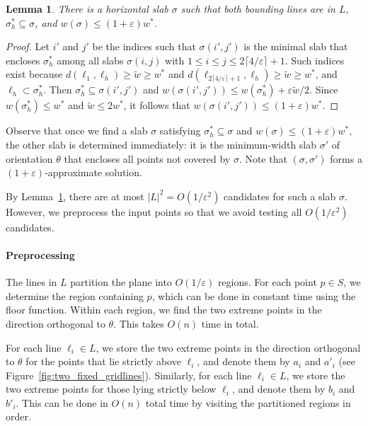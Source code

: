 \documentclass[10pt,a4paper]{article}
\newtheorem{lemma}[theorem]{Lemma}
\theoremstyle{star}
\theoremstyle{claimstar}
\newcommand{\eps}{\ensuremath{\varepsilon}}
\begin{document}
\begin{lemma}
    \label{lem:two_fixed_gridlines}
    There is a horizontal slab $\sigma$ such that  
    both bounding lines are in $L$, 
    $\sigma_h^* \subseteq \sigma $, and $w(\sigma) \le (1 + \eps) w^*$.
\end{lemma}
\begin{proof}
    Let $i'$ and $j'$ be the indices such that $\sigma(i', j')$ is the minimal slab that encloses $\sigma_h^*$ among all slabs $\sigma(i,j)$ with $1 \le i \le j \le 2\lceil 4/\eps \rceil + 1$.
    Such indices exist because $d(\ell_1, \ell_h) \ge \widetilde w \ge w^*$ and $d(\ell_{2 \lceil 4/\eps \rceil +1 }, \ell_h)\ge \widetilde w \ge w^*$, and $\ell_h \subset \sigma_h^*$. 
    Then $\sigma_h^* \subseteq \sigma(i', j')$ and $w(\sigma(i', j')) \le w(\sigma_h^*) + \eps \widetilde{w}/2$. 
    Since $w(\sigma_h^*) \le w^*$ and $\widetilde w \le 2w^*$, it follows that $w(\sigma(i', j')) \le (1+\eps) w^*$. 
\end{proof}

Observe that once we find a slab $\sigma$ satisfying $\sigma_h^* \subseteq \sigma$ and 
$w(\sigma) \le (1+\eps)w^*$, the other slab is determined immediately: it is the minimum-width slab 
$\sigma'$ of orientation $\theta$ that encloses all points not covered by $\sigma$.  
Note that $(\sigma, \sigma')$ forms a $(1+\eps)$-approximate solution.

By Lemma~\ref{lem:two_fixed_gridlines},   there are at most $|L|^2 = O(1/\eps^2)$ candidates for such a slab $\sigma$.  
However, we preprocess the input points so that we avoid testing all $O(1/\eps^2)$ candidates.


\paragraph*{Preprocessing}
The lines in $L$ partition the plane into $O(1/\eps)$ regions. 
For each point $p \in S$, we determine the region containing $p$, which can be done in constant time using the floor function.  
Within each region, we find the two extreme points in the direction orthogonal to $\theta$. 
This takes $O(n)$ time in total. 

For each line $\ell_i \in L$, we store the two extreme points in the direction orthogonal to $\theta$ for the points that lie strictly above $\ell_i$, and denote them by $a_i$ and $a'_i$ (see Figure~\ref{fig:two_fixed_gridlines}).
Similarly, for each line $\ell_i \in L$, we store the two extreme points for those lying strictly below $\ell_i$, and denote them by $b_i$ and $b'_i$.
This can be done in $O(n)$ total time by visiting the partitioned regions in order. 
\end{document}
